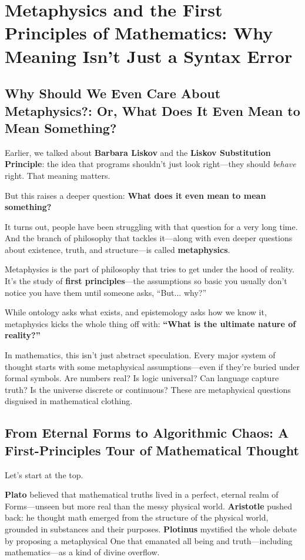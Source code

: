 \section{Metaphysics and the First Principles of Mathematics: Why Meaning Isn't Just a Syntax Error}

\subsection{Why Should We Even Care About Metaphysics?: Or, What Does It Even Mean to Mean Something?}

Earlier, we talked about \textbf{Barbara Liskov} and the \textbf{Liskov Substitution Principle}: the idea that programs shouldn’t just look right—they should \emph{behave} right. That meaning matters.

But this raises a deeper question:  
\textbf{What does it even mean to mean something?}

It turns out, people have been struggling with that question for a very long time. And the branch of philosophy that tackles it—along with even deeper questions about existence, truth, and structure—is called \textbf{metaphysics}.

Metaphysics is the part of philosophy that tries to get under the hood of reality. It’s the study of \textbf{first principles}—the assumptions so basic you usually don’t notice you have them until someone asks, “But... why?”

While ontology asks what exists, and epistemology asks how we know it, metaphysics kicks the whole thing off with:  
\textbf{“What is the ultimate nature of reality?”}

In mathematics, this isn’t just abstract speculation. Every major system of thought starts with some metaphysical assumptions—even if they’re buried under formal symbols. Are numbers real? Is logic universal? Can language capture truth? Is the universe discrete or continuous? These are metaphysical questions disguised in mathematical clothing.

\subsection{From Eternal Forms to Algorithmic Chaos: A First-Principles Tour of Mathematical Thought}

Let’s start at the top.

\textbf{Plato} believed that mathematical truths lived in a perfect, eternal realm of Forms—unseen but more real than the messy physical world.  
\textbf{Aristotle} pushed back: he thought math emerged from the structure of the physical world, grounded in substances and their purposes.  
\textbf{Plotinus} mystified the whole debate by proposing a metaphysical One that emanated all being and truth—including mathematics—as a kind of divine overflow.

